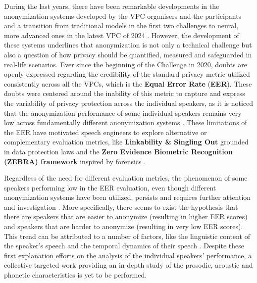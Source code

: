 \documentclass[12pt,leqno,a4paper]{article}
\begin{document}
During the last years, there have been remarkable developments in the anonymization systems developed by the VPC organisers and the participants \citep{panariello_voiceprivacy_2024, VoicePrivacy2024, tomashenko_voiceprivacy_2022-1} 
and a transition from traditional models in the first two challenges \citep{mawalim_x-vector_2020, gupta_design_nodate} to neural, more advanced ones 
in the latest VPC of 2024 \citep{leang_exploring_nodate, hua_emotional_2024}. 
However, the development of these systems underlines that anonymization is not only a technical challenge but also a question of how privacy 
should be quantified, measured and safeguarded in real-life scenarios. Ever since the beginning of the Challenge in 2020, doubts are openly 
expressed regarding the credibility of the standard privacy metric utilized consistently across all the VPCs, which is 
the \textbf{Equal Error Rate} (\textbf{EER}). These doubts were centered around the inability of this metric to capture and express the 
variability of privacy protection across the individual speakers, as it is noticed that the anonymization performance of some individual speakers 
remains very low across fundamentally different anonymization systems \citep{gaznepoglu2025sayexploitinglinguisticcontent, williams_anonymizing_2024,nautsch20_interspeech}. 
These limitations of the EER have motivated speech engineers to explore alternative or complementary evaluation metrics, 
like \textbf{Linkability \& Singling Out} \citep{vauquier25_interspeech} grounded in data protection laws and 
the \textbf{Zero Evidence Biometric Recognition (ZEBRA) framework} inspired by forensics \citep{nautsch20_interspeech, 10.1016/j.csl.2021.101299}.

Regardless of the need for different evaluation metrics, the phenomenon of some speakers performing low in the EER evaluation, 
even though different anonymization systems have been utilized, persists and requires further attention and investigation 
\citep{gaznepoglu2025sayexploitinglinguisticcontent, williams_anonymizing_2024}. 
More specifically, there seems to exist the hypothesis that there are speakers that are easier to anonymize (resulting in higher EER scores) and 
speakers that are harder to anonymize (resulting in very low EER scores). This trend can be attributed to a number of factors, like the linguistic 
content of the speaker's speech and the temporal dynamics of their speech \citep{tomashenko_exploiting_2025, tomashenko_analysis_2025}. 
Despite these first explanation efforts on the analysis of the individual speakers' performance, a collective targeted work providing an in-depth study of the prosodic, acoustic and phonetic characteristics is yet 
to be performed.
\end{document}

